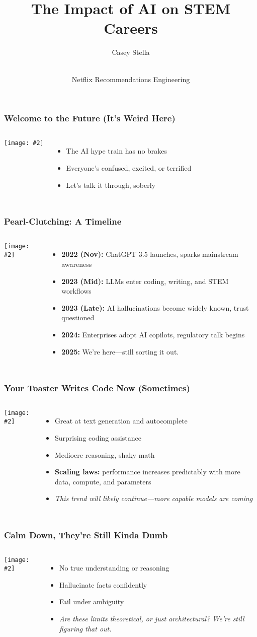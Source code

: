 \documentclass{beamer}
\title{The Impact of AI on STEM Careers}
\author{Casey Stella}
\date{\\Netflix Recommendations Engineering}
\newcommand{\slidewithimage}[3]{%
  \begin{frame}
    \frametitle{#1}
    \begin{columns}
      \column{0.5\textwidth}
        \texttt{[image: \#2]}\\[1em]
      \column{0.5\textwidth}
        #3
    \end{columns}
  \end{frame}
}
\begin{document}
\begin{frame}
  \titlepage
\end{frame}

\slidewithimage{Welcome to the Future (It’s Weird Here)}{future-image.png}{
  \begin{itemize}
    \item The AI hype train has no brakes
    \item Everyone’s confused, excited, or terrified
    \item Let's talk it through, soberly
  \end{itemize}
}

\slidewithimage{Pearl-Clutching: A Timeline}{timeline-image.png}{
  \begin{itemize}
    \item \textbf{2022 (Nov):} ChatGPT 3.5 launches, sparks mainstream awareness
    \item \textbf{2023 (Mid):} LLMs enter coding, writing, and STEM workflows
    \item \textbf{2023 (Late):} AI hallucinations become widely known, trust questioned
    \item \textbf{2024:} Enterprises adopt AI copilots, regulatory talk begins
    \item \textbf{2025:} We’re here—still sorting it out.
  \end{itemize}
}

\slidewithimage{Your Toaster Writes Code Now (Sometimes)}{capabilities-image.png}{
  \begin{itemize}
    \item Great at text generation and autocomplete
    \item Surprising coding assistance
    \item Mediocre reasoning, shaky math
    \item \textbf{Scaling laws:} performance increases predictably with more data, compute, and parameters
    \item \textit{This trend will likely continue—more capable models are coming}
  \end{itemize}
}

\slidewithimage{Calm Down, They’re Still Kinda Dumb}{limitations-image.png}{
  \begin{itemize}
    \item No true understanding or reasoning
    \item Hallucinate facts confidently
    \item Fail under ambiguity
    \item \textit{Are these limits theoretical, or just architectural? We're still figuring that out.}
  \end{itemize}
}
\end{document}
